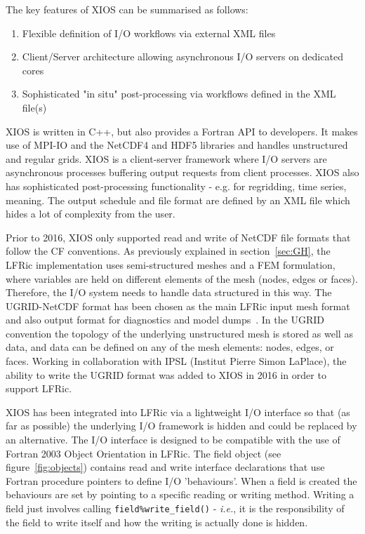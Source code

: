 \documentclass[times]{elsarticle}
\begin{document}
The key features of XIOS can be summarised as follows:
\begin{enumerate}
  \item Flexible definition of I/O workflows via external XML files
  \item Client/Server architecture allowing asynchronous I/O servers on dedicated cores
  \item Sophisticated "in situ" post-processing via workflows defined in the XML file(s) 
\end{enumerate}

XIOS is written in C++, but also provides a Fortran API to developers. It makes use of
MPI-IO and the NetCDF4 and HDF5 libraries and handles unstructured and regular grids.
XIOS is a client-server framework where I/O servers are asynchronous processes buffering
output requests from client processes. XIOS also has sophisticated post-processing
functionality - e.g. for regridding, time series, meaning. The output schedule and
file format are defined by an XML file which hides a lot of complexity from the user.

Prior to 2016, XIOS only supported read and write of NetCDF file formats that follow the CF
conventions.  As previously explained in section~\ref{sec:GH}, the LFRic implementation uses
semi-structured meshes and a FEM formulation, where variables are held on
different elements of the mesh (nodes, edges or faces). Therefore, the I/O system needs to
handle data structured in this way. The UGRID-NetCDF format has been chosen as the main
LFRic input mesh format and also output format for diagnostics and model dumps~\cite{UgridSpec}.
In the UGRID convention the topology of the underlying unstructured mesh is stored as well as
data, and data can be defined on any of the mesh elements: nodes, edges, or faces.
Working in collaboration with IPSL (Institut Pierre Simon LaPlace), the ability to write the
UGRID format was added to XIOS in 2016 in order to support LFRic. 

XIOS has been integrated into LFRic via a lightweight I/O interface so
that (as far as possible) the underlying I/O framework is hidden and
could be replaced by an alternative.  The I/O interface is designed to
be compatible with the use of Fortran 2003 Object Orientation in
LFRic. The field object (see figure~\ref{fig:objects}) contains read and write
interface declarations that use Fortran procedure pointers to define
I/O 'behaviours'. When a field is created the behaviours are set by
pointing to a specific reading or writing method. Writing a field just
involves calling \verb+field%write_field()+ - {\em i.e.}, it is the
responsibility of the field to write itself and how the writing is
actually done is hidden.
\end{document}
